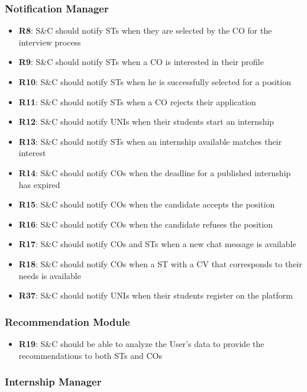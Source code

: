 \subsubsection{Notification Manager}
\begin{itemize}
    \item \textbf{R8}: S\&C should notify STs when they are selected by the CO for the interview process
    \item \textbf{R9}: S\&C should notify STs when a CO is interested in their profile
    \item \textbf{R10}: S\&C should notify STs when he is successfully selected for a position
    \item \textbf{R11}: S\&C should notify STs when a CO rejects their application
    \item \textbf{R12}: S\&C should notify UNIs when their students start an internship
    \item \textbf{R13}: S\&C should notify STs when an internship available matches their interest
    \item \textbf{R14}: S\&C should notify COs when the deadline for a published internship has expired
    \item \textbf{R15}: S\&C should notify COs when the candidate accepts the position
    \item \textbf{R16}: S\&C should notify COs when the candidate refuses the position
    \item \textbf{R17}: S\&C should notify COs and STs when a new chat message is available
    \item \textbf{R18}: S\&C should notify COs when a ST with a CV that corresponds to their needs is available
    \item \textbf{R37}: S\&C  should notify UNIs when their students register on the platform
\end{itemize}


\subsubsection{Recommendation Module}
\begin{itemize}
    \item \textbf{R19}: S\&C should be able to analyze the User's data to provide the recommendations to both STs and COs
\end{itemize}


\subsubsection{Internship Manager}
